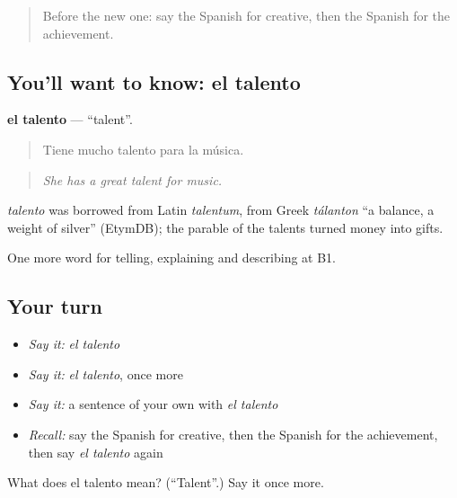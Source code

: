 \label{lesson:ES-C766-talento}



\begin{quote}
Before the new one: say the Spanish for creative, then the Spanish for the achievement.
\end{quote}

\subsection*{You'll want to know: el talento}
\textbf{el talento} — \textquotedblleft{}talent\textquotedblright{}.

\begin{quote}
Tiene mucho talento para la música.
\end{quote}

\begin{quote}
\emph{She has a great talent for music.}
\end{quote}

\begin{cousinweb}
\emph{talento} was borrowed from Latin \emph{talentum}, from Greek \emph{tálanton} \textquotedblleft{}a balance, a weight of silver\textquotedblright{} (EtymDB); the parable of the talents turned money into gifts.
\end{cousinweb}

\begin{grammarlens}[title={What you've built}]
One more word for telling, explaining and describing at B1.
\end{grammarlens}

\subsection*{Your turn}
\begin{itemize}
\raggedright
  \item \emph{Say it:} \emph{el talento}
  \item \emph{Say it:} \emph{el talento}, once more
  \item \emph{Say it:} a sentence of your own with \emph{el talento}
  \item \emph{Recall:} say the Spanish for creative, then the Spanish for the achievement, then say \emph{el talento} again
\end{itemize}

\begin{tcolorbox}[breakable,colback=teal!4,colframe=teal!35!black,title={Before you move on}]
What does el talento mean? (\textquotedblleft{}Talent\textquotedblright{}.) Say it once more.
\end{tcolorbox}
